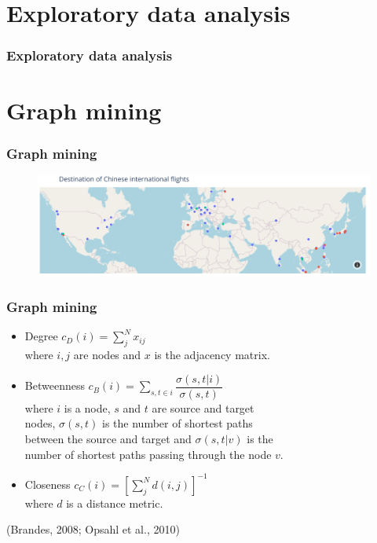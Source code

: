 \documentclass{beamer}
\begin{document}
\section{Exploratory data analysis}
\begin{frame}
\frametitle{Exploratory data analysis}

\end{frame}

\section{Graph mining}
\begin{frame}
\frametitle{Graph mining}

\begin{figure}
\centering
\includegraphics[width=0.8\linewidth]{../visualizations/chinese_flights_screenshot.png}
\end{figure}

\end{frame}


\begin{frame}
\frametitle{Graph mining}

\begin{itemize}
  \item Degree \hspace{36px} $c_D (i) = \sum_j^N x_{ij}$ \\
    \hspace{72px} where $i, j$ are nodes and $x$ is the adjacency matrix.
  \vfill
  \item Betweenness \hspace{10px} $c_B (i) = \sum_{s, t \in i} \dfrac{\sigma (s, t | i)}{\sigma (s, t)}$ \\
    \hspace{72px} where $i$ is a node, $s$ and $t$ are source and target \\
    \hspace{72px} nodes, $\sigma (s, t)$ is the number of shortest paths \\
    \hspace{72px} between the source and target and $\sigma (s, t | v)$ is the \\
    \hspace{72px} number of shortest paths passing through the node $v$.
  \vfill
  \item Closeness \hspace{25px} $c_C(i) = \left[ \sum_j^N d(i, j) \right]^{-1}$ \\
    \hspace{72px} where $d$ is a distance metric.
\end{itemize}

\vfill

(Brandes, 2008; Opsahl et al., 2010)

\end{frame}
\end{document}
